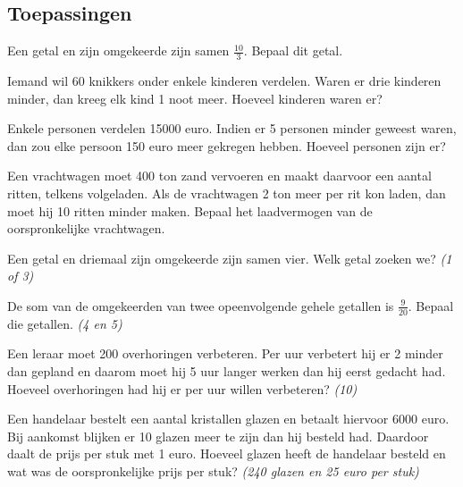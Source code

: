 \documentclass[a4paper,12pt]{article}
\begin{document}
\subsection{Toepassingen}

\begin{oefening}
Een getal en zijn omgekeerde zijn samen $\frac{10}{3}$. Bepaal dit getal.
\end{oefening}

\begin{oefening}
Iemand wil 60 knikkers onder enkele kinderen verdelen. Waren er drie kinderen minder, dan kreeg elk kind 1 noot meer. Hoeveel kinderen waren er?
\end{oefening}

\begin{oefening}
Enkele personen verdelen 15000 euro. Indien er 5 personen minder geweest waren, dan zou elke persoon 150 euro meer gekregen hebben. Hoeveel personen zijn er?
\end{oefening}

\begin{oefening}
Een vrachtwagen moet 400 ton zand vervoeren en maakt daarvoor een aantal ritten, telkens volgeladen. Als de vrachtwagen 2 ton meer per rit kon laden, dan moet hij 10 ritten minder maken. Bepaal het laadvermogen van de oorspronkelijke vrachtwagen.
\end{oefening}

\begin{oefening}
Een getal en driemaal zijn omgekeerde zijn samen vier. Welk getal zoeken we? \hfill {\em (1 of 3)}
\end{oefening}

\begin{oefening}
De som van de omgekeerden van twee opeenvolgende gehele getallen is $\frac{9}{20}$. Bepaal die getallen. \hfill {\em (4 en 5)}
\end{oefening}

\begin{oefening}
Een leraar moet 200 overhoringen verbeteren. Per uur verbetert hij er 2 minder dan gepland en daarom moet hij 5 uur langer werken dan hij eerst gedacht had. Hoeveel overhoringen had hij er per uur willen verbeteren? \hfill {\em (10)}
\end{oefening}

\begin{oefening}
Een handelaar bestelt een aantal kristallen glazen en betaalt hiervoor 6000 euro. Bij aankomst blijken er 10 glazen meer te zijn dan hij besteld had. Daardoor daalt de prijs per stuk met 1 euro. Hoeveel glazen heeft de handelaar besteld en wat was de oorspronkelijke prijs per stuk? \hfill {\em (240 glazen en 25 euro per stuk)}
\end{oefening}
\end{document}
